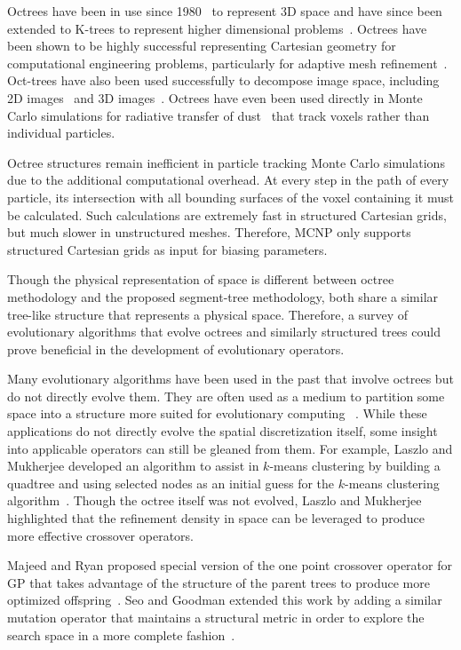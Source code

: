 \documentclass{article}
\begin{document}
Octrees have been in use since 1980~\cite{ref:jackins1980249} to represent 3D space and have since been extended to K-trees to represent higher dimensional problems~\cite{ref:jackins1983533}. Octrees have been shown to be highly successful representing Cartesian geometry for computational engineering problems, particularly for adaptive mesh refinement~\cite{ref:Linden201558}. Oct-trees have also been used successfully to decompose image space, including 2D images~\cite{ref:Lange2004592} and 3D images~\cite{ref:udomchaiporn2013229, ref:Lee2010359}. Octrees have even been used directly in Monte Carlo simulations for radiative transfer of dust~\cite{ref:Saftly2013} that track voxels rather than individual particles.

Octree structures remain inefficient in particle tracking Monte Carlo simulations due to the additional computational overhead. At every step in the path of every particle, its intersection with all bounding surfaces of the voxel containing it must be calculated. Such calculations are extremely fast in structured Cartesian grids, but much slower in unstructured meshes. Therefore, MCNP only supports structured Cartesian grids as input for biasing parameters.

Though the physical representation of space is different between octree methodology and the proposed segment-tree methodology, both share a similar tree-like structure that represents a physical space. Therefore, a survey of evolutionary algorithms that evolve octrees and similarly structured trees could prove beneficial in the development of evolutionary operators.

Many evolutionary algorithms have been used in the past that involve octrees but do not directly evolve them. They are often used as a medium to partition some space into a structure more suited for evolutionary computing ~\cite{ref:Zhu2015301, ref:Schwertfeger200853}. While these applications do not directly evolve the spatial discretization itself, some insight into applicable operators can still be gleaned from them. For example, Laszlo and Mukherjee developed an algorithm to assist in $k$-means clustering by building a quadtree and using selected nodes as an initial guess for the $k$-means clustering algorithm~\cite{ref:Laszlo2006}. Though the octree itself was not evolved, Laszlo and Mukherjee highlighted that the refinement density in space can be leveraged to produce more effective crossover operators.

Majeed and Ryan proposed special version of the one point crossover operator for GP that takes advantage of the structure of the parent trees to produce more optimized offspring~\cite{ref:Majeed2007}. Seo and Goodman extended this work by adding a similar mutation operator that maintains a structural metric in order to explore the search space in a more complete fashion~\cite{ref:seo2009}.
\end{document}
